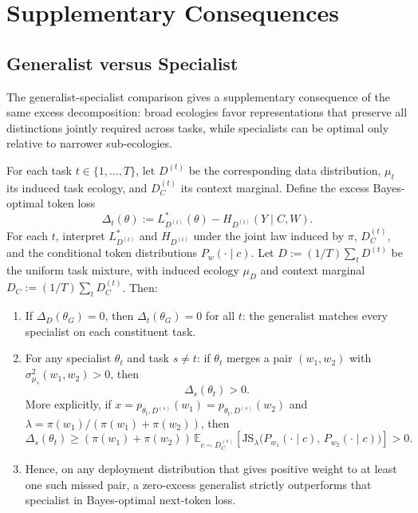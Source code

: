 \documentclass[twoside,11pt]{article}
\newcommand{\sigmasq}{\sigma^2}
\newcommand{\E}{\mathbb{E}}
\newcommand{\JS}{\mathrm{JS}}
\begin{document}
\section{Supplementary Consequences}

\subsection{Generalist versus Specialist}\label{sec:genspec}

The generalist-specialist comparison gives a supplementary consequence of the same excess decomposition: broad ecologies favor representations that preserve all distinctions jointly required across tasks, while specialists can be optimal only relative to narrower sub-ecologies.

\begin{theorem}\label{thm:gen-vs-spec}
For each task $t \in \{1,\ldots,T\}$, let $D^{(t)}$ be the corresponding data distribution, $\mu_t$ its induced task ecology, and $D_C^{(t)}$ its context marginal.
Define the excess Bayes-optimal token loss
\[
\Delta_t(\theta) := L_{D^{(t)}}^*(\theta) - H_{D^{(t)}}(Y \mid C,W).
\]
For each $t$, interpret $L_{D^{(t)}}^*$ and $H_{D^{(t)}}$ under the joint law induced by $\pi$, $D_C^{(t)}$, and the conditional token distributions $P_w(\cdot\mid c)$. Let $D := (1/T)\sum_t D^{(t)}$ be the uniform task mixture, with induced ecology $\mu_D$ and context marginal $D_C := (1/T)\sum_t D_C^{(t)}$. Then:
\begin{enumerate}[label=(\alph*)]
\item If $\Delta_D(\theta_G)=0$, then $\Delta_t(\theta_G)=0$ for all $t$: the generalist matches every specialist on each constituent task.

\item For any specialist $\theta_t$ and task $s \neq t$: if $\theta_t$ merges a pair $(w_1,w_2)$ with $\sigmasq_{\mu_s}(w_1,w_2)>0$, then
\[
\Delta_s(\theta_t) > 0.
\]
More explicitly, if $x=p_{\theta_t,D^{(s)}}(w_1)=p_{\theta_t,D^{(s)}}(w_2)$ and $\lambda=\pi(w_1)/(\pi(w_1)+\pi(w_2))$, then
\[
\Delta_s(\theta_t)
\ge (\pi(w_1)+\pi(w_2))\,
   \E_{c\sim D_C^{(s)}}
   \!\left[\JS_{\lambda}
   \bigl(P_{w_1}(\cdot\mid c),\,P_{w_2}(\cdot\mid c)\bigr)\right]
> 0.
\]

\item Hence, on any deployment distribution that gives positive weight to at least one such missed pair, a zero-excess generalist strictly outperforms that specialist in Bayes-optimal next-token loss.
\end{enumerate}
\end{theorem}
\end{document}
